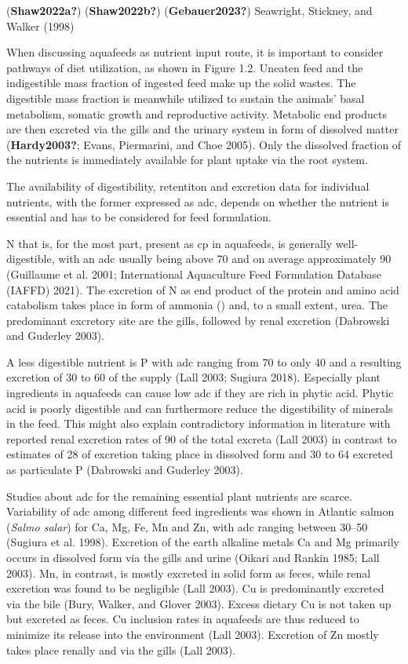 \documentclass[preprint, 3p,
authoryear]{elsarticle} %
\begin{document}
(\textbf{Shaw2022a?}) (\textbf{Shaw2022b?}) (\textbf{Gebauer2023?})
Seawright, Stickney, and Walker (1998)

When discussing aquafeeds as nutrient input route, it is important to
consider pathways of diet utilization, as shown in Figure 1.2. Uneaten
feed and the indigestible mass fraction of ingested feed make up the
solid wastes. The digestible mass fraction is meanwhile utilized to
sustain the animals' basal metabolism, somatic growth and reproductive
activity. Metabolic end products are then excreted via the gills and the
urinary system in form of dissolved matter (\textbf{Hardy2003?}; Evans,
Piermarini, and Choe 2005). Only the dissolved fraction of the nutrients
is immediately available for plant uptake via the root system.

The availability of digestibility, retentiton and excretion data for
individual nutrients, with the former expressed as \gls{adc}, depends on
whether the nutrient is essential and has to be considered for feed
formulation.

N that is, for the most part, present as \gls{cp} in aquafeeds, is
generally well-digestible, with an \gls{adc} usually being above
\SI{70}{\p} and on average approximately \SI{90}{\p} (Guillaume et al.
2001; International Aquaculture Feed Formulation Database (IAFFD) 2021).
The excretion of N as end product of the protein and amino acid
catabolism takes place in form of ammonia () and, to a small
extent, urea. The predominant excretory site are the gills, followed by
renal excretion (Dabrowski and Guderley 2003).

A less digestible nutrient is P with \gls{adc} ranging from \SI{70}{\p}
to only \SI{40}{\p} and a resulting excretion of \SI{30}{\p} to
\SI{60}{\p} of the supply (Lall 2003; Sugiura 2018). Especially plant
ingredients in aquafeeds can cause low \gls{adc} if they are rich in
phytic acid. Phytic acid is poorly digestible and can furthermore reduce
the digestibility of minerals in the feed. This might also explain
contradictory information in literature with reported renal excretion
rates of \SI{90}{\p} of the total excreta (Lall 2003) in contrast to
estimates of \SI{28}{\p} of excretion taking place in dissolved form and
\SI{30}{\p} to \SI{64}{\p} excreted as particulate P (Dabrowski and
Guderley 2003).

Studies about \gls{adc} for the remaining essential plant nutrients are
scarce. Variability of \gls{adc} among different feed ingredients was
shown in Atlantic salmon (\emph{Salmo salar}) for Ca, Mg, Fe, Mn and Zn,
with \gls{adc} ranging between \SIrange{30}{50}{\p} (Sugiura et al.
1998). Excretion of the earth alkaline metals Ca and Mg primarily occurs
in dissolved form via the gills and urine (Oikari and Rankin 1985; Lall
2003). Mn, in contrast, is mostly excreted in solid form as feces, while
renal excretion was found to be negligible (Lall 2003). Cu is
predominantly excreted via the bile (Bury, Walker, and Glover 2003).
Excess dietary Cu is not taken up but excreted as feces. Cu inclusion
rates in aquafeeds are thus reduced to minimize its release into the
environment (Lall 2003). Excretion of Zn mostly takes place renally and
via the gills (Lall 2003).
\end{document}
